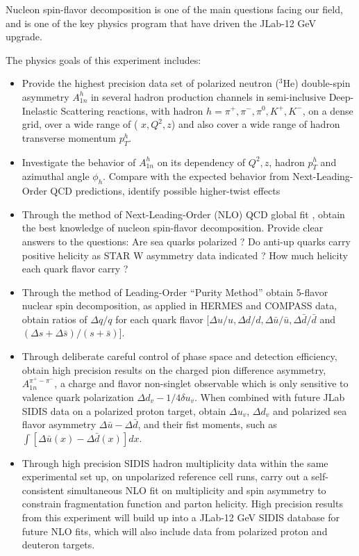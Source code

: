 Nucleon spin-flavor decomposition is one of the main questions facing our field, and is one of the key physics  program that have driven the JLab-12 GeV upgrade.



The physics goals of this experiment includes:

\begin{itemize}
\item {Provide the highest precision data set of polarized neutron ($^3$He) double-spin asymmetry $A_{1n}^h$ in several hadron production channels in semi-inclusive Deep-Inelastic Scattering reactions, with hadron $h=\pi^+, \pi^-, \pi^0, K^+, K^-$,  on a dense grid, over a wide range of ( $x, Q^2, z$) and also cover a wide range of hadron transverse momentum $p_T^h$.}    

\item {Investigate the behavior of  $A_{1n}^h$  on its dependency of $Q^2, z$, hadron $p_T^h$ and azimuthal angle $\phi_h$. Compare with the expected behavior from Next-Leading-Order  QCD predictions, identify possible higher-twist effects }

\item { Through the method of Next-Leading-Order (NLO)  QCD global fit , obtain the best knowledge of nucleon spin-flavor decomposition.  Provide clear answers to the questions: Are sea quarks polarized ? Do anti-up quarks carry positive helicity as STAR W asymmetry data indicated ?  How much helicity  each quark flavor carry ?  }

\item { Through the method of Leading-Order ``Purity Method'' obtain 5-flavor nuclear spin decomposition,  as applied in HERMES and COMPASS data, obtain ratios of  $\Delta q/q$ for each quark flavor [$\Delta u/u, \Delta d/d, \Delta \bar{u}/\bar{u},  \Delta \bar{d}/\bar{d}$    and $ (\Delta s+\Delta \bar{s})/(s+\bar{s})$]. }  

\item { Through deliberate careful control of phase space and detection efficiency, obtain high precision results on the charged pion difference asymmetry, $A_{1n}^{\pi^+-\pi^-}$, a charge and flavor non-singlet observable which is only sensitive to valence quark polarization $\Delta d_v - 1/4 \delta u_v$.  When combined with future JLab  SIDIS data on a polarized proton target,  obtain $\Delta u_v$, $\Delta d_v$ and polarized sea flavor asymmetry $\Delta \bar{u}-\Delta \bar{d}$, and their fist moments, such as $\int  [\Delta \bar{u}(x)-\Delta \bar{d}(x)] dx$. } 

\item { Through high precision SIDIS hadron multiplicity data  within the same experimental set up, on  unpolarized reference cell runs,        carry out a self-consistent simultaneous NLO fit on multiplicity and spin asymmetry to  constrain fragmentation function and parton helicity.    High precision results from this experiment will build up into a JLab-12 GeV SIDIS database for future NLO fits, which will also include data from polarized proton and deuteron targets.}
\end{itemize}

